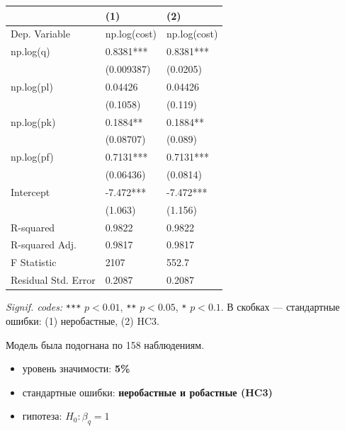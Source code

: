 \documentclass[
  russian,
]{article}
\newcounter{none} %
\providecommand{\tightlist}{%
  \setlength{\itemsep}{0pt}\setlength{\parskip}{0pt}}
\begin{document}
{\def\LTcaptype{none} %
\begin{longtable}[]{@{}lll@{}}
\toprule\noalign{}
& (1) & (2) \\
\midrule\noalign{}
\endhead
\bottomrule\noalign{}
\endlastfoot
Dep. Variable & np.log(cost) & np.log(cost) \\
np.log(q) & 0.8381*** & 0.8381*** \\
& (0.009387) & (0.0205) \\
np.log(pl) & 0.04426 & 0.04426 \\
& (0.1058) & (0.119) \\
np.log(pk) & 0.1884** & 0.1884** \\
& (0.08707) & (0.089) \\
np.log(pf) & 0.7131*** & 0.7131*** \\
& (0.06436) & (0.0814) \\
Intercept & -7.472*** & -7.472*** \\
& (1.063) & (1.156) \\
R-squared & 0.9822 & 0.9822 \\
R-squared Adj. & 0.9817 & 0.9817 \\
F Statistic & 2107 & 552.7 \\
Residual Std. Error & 0.2087 & 0.2087 \\
\end{longtable}
}

\emph{Signif. codes:} \texttt{***} \(p<0.01\), \texttt{**} \(p<0.05\),
\texttt{*} \(p<0.1\). В скобках --- стандартные ошибки: (1) неробастные,
(2) HC3.

Модель была подогнана по 158 наблюдениям.

\begin{tcolorbox}[enhanced jigsaw, arc=.35mm, bottomrule=.15mm, bottomtitle=1mm, breakable, colback=white, colbacktitle=quarto-callout-important-color!10!white, colframe=quarto-callout-important-color-frame, coltitle=black, left=2mm, leftrule=.75mm, opacityback=0, opacitybacktitle=0.6, rightrule=.15mm, title=\textcolor{quarto-callout-important-color}{\faExclamation}\hspace{0.5em}{Условия теста}, titlerule=0mm, toprule=.15mm, toptitle=1mm]

\begin{itemize}
\tightlist
\item
  уровень значимости: \textbf{5\%}
\item
  стандартные ошибки: \textbf{неробастные и робастные (HC3)}
\item
  гипотеза: \(H_0:\beta_{q}=1\)
\end{itemize}

\end{tcolorbox}
\end{document}
